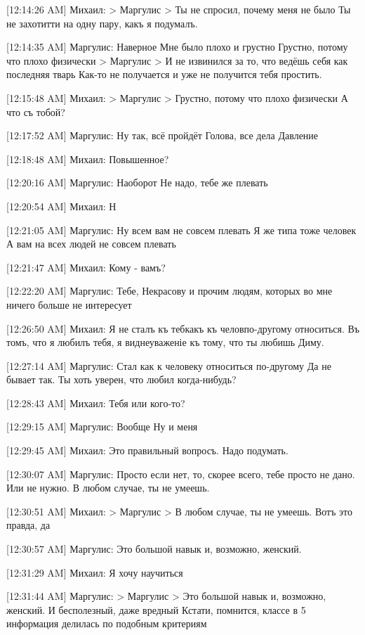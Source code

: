 \documentclass{article}
\newcommand{\yat}{{\fontencoding{X2}\selectfont\cyryat}} %
\begin{document}
[12:14:26 AM] Михаил:
> Маргулис
> Ты не спросил, почему меня не было
Ты не захот итти на одну пару, какъ я подумалъ.

[12:14:35 AM] Маргулис:
Наверное
 Мне было плохо и грустно
 Грустно, потому что плохо физически
> Маргулис
> И не извинился за то, что ведёшь себя как последняя тварь
Как-то не получается и уже не получится тебя простить.

[12:15:48 AM] Михаил:
> Маргулис
> Грустно, потому что плохо физически
А что съ тобой?

[12:17:52 AM] Маргулис:
Ну так, всё пройдёт
 Голова, все дела
 Давление

[12:18:48 AM] Михаил:
Повышенное?

[12:20:16 AM] Маргулис:
Наоборот
 Не надо, тебе же плевать

[12:20:54 AM] Михаил:
Н

[12:21:05 AM] Маргулис:
Ну всем вам не совсем плевать
 Я же типа тоже человек
 А вам на всех людей не совсем плевать

[12:21:47 AM] Михаил:
Кому - вамъ?

[12:22:20 AM] Маргулис:
Тебе, Некрасову и прочим людям, которых во мне ничего больше не интересует

[12:26:50 AM] Михаил:
Я не сталъ къ теб\yat какъ къ челов по-другому относиться. 
Въ томъ, что я любилъ тебя, я вид неуваженіе къ тому, что ты любишь Диму.

[12:27:14 AM] Маргулис:
Стал как к человеку относиться по-другому
 Да не бывает так. Ты хоть уверен, что любил когда-нибудь?

[12:28:43 AM] Михаил:
Тебя или кого-то?

[12:29:15 AM] Маргулис:
Вообще
 Ну и меня

[12:29:45 AM] Михаил:
Это правильный вопросъ.
 Надо подумать.

[12:30:07 AM] Маргулис:
Просто если нет, то, скорее всего, тебе просто не дано.
 Или не нужно.
 В любом случае, ты не умеешь.

[12:30:51 AM] Михаил:
> Маргулис
> В любом случае, ты не умеешь.
Вотъ это правда, да

[12:30:57 AM] Маргулис:
Это большой навык и, возможно, женский.

[12:31:29 AM] Михаил:
Я хочу научиться

[12:31:44 AM] Маргулис:
> Маргулис
> Это большой навык и, возможно, женский.
И бесполезный, даже вредный
 Кстати, помнится, классе в 5 информация делилась по подобным критериям
\end{document}
